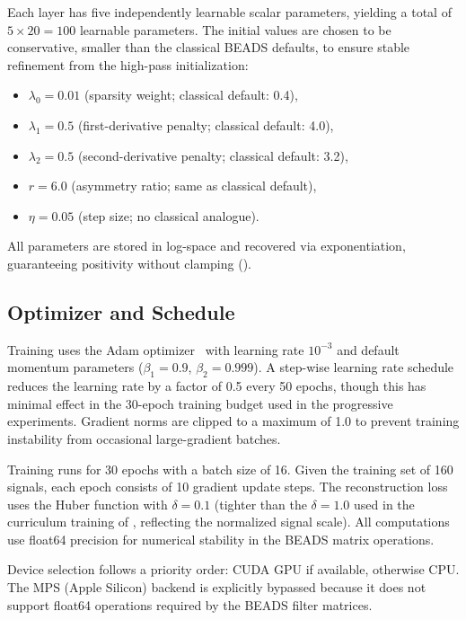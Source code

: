 Each layer has five independently learnable scalar parameters, yielding a total of $5 \times 20 = 100$ learnable parameters. The initial values are chosen to be conservative, smaller than the classical BEADS defaults, to ensure stable refinement from the high-pass initialization:
\begin{itemize}
    \item $\lambda_0 = 0.01$ (sparsity weight; classical default: 0.4),
    \item $\lambda_1 = 0.5$ (first-derivative penalty; classical default: 4.0),
    \item $\lambda_2 = 0.5$ (second-derivative penalty; classical default: 3.2),
    \item $r = 6.0$ (asymmetry ratio; same as classical default),
    \item $\eta = 0.05$ (step size; no classical analogue).
\end{itemize}
All parameters are stored in log-space and recovered via exponentiation, guaranteeing positivity without clamping ().


\subsection{Optimizer and Schedule}
\label{sec:exp_optimizer}

Training uses the Adam optimizer~\cite{kingma2015adam} with learning rate $10^{-3}$ and default momentum parameters ($\beta_1 = 0.9$, $\beta_2 = 0.999$). A step-wise learning rate schedule reduces the learning rate by a factor of 0.5 every 50 epochs, though this has minimal effect in the 30-epoch training budget used in the progressive experiments. Gradient norms are clipped to a maximum of 1.0 to prevent training instability from occasional large-gradient batches.

Training runs for 30 epochs with a batch size of 16. Given the training set of 160 signals, each epoch consists of 10 gradient update steps. The reconstruction loss uses the Huber function with $\delta = 0.1$ (tighter than the $\delta = 1.0$ used in the curriculum training of , reflecting the normalized signal scale). All computations use float64 precision for numerical stability in the BEADS matrix operations.

Device selection follows a priority order: CUDA GPU if available, otherwise CPU. The MPS (Apple Silicon) backend is explicitly bypassed because it does not support float64 operations required by the BEADS filter matrices.


